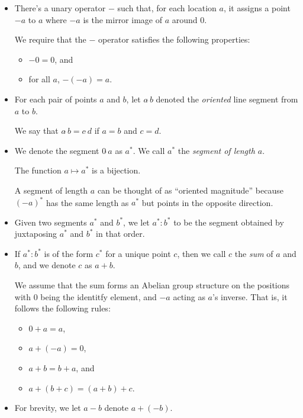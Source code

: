 \documentclass[10pt]{article}
\begin{document}
  \begin{itemize}

  	\item There's a unary operator $-$ such that, for each location $a$, it assigns a point $-a$ to $a$ where $-a$ is the mirror image of $a$ around $0$.

  	We require that the $-$ operator satisfies the following properties:
  	\begin{itemize}
  		\item $-0 = 0$, and
  		\item for all $a$, $-(-a) = a$. 
  	\end{itemize}

  	\item For each pair of points $a$ and $b$, let $a\hat{\ }b$ denoted the \emph{oriented} line segment from $a$ to $b$.

  	We say that $a\hat{\ }b = c\hat{\ }d$ if $a = b$ and $c = d$.

  	\item We denote the segment $0\hat{\ }a$ as $a^*$. We call $a^*$ the \emph{segment of length $a$}.

  	The function $a \mapsto a^*$ is a bijection.

  	A segment of length $a$ can be thought of as ``oriented magnitude'' because $(-a)^*$ has the same length as $a^*$ but points in the opposite direction.

  	\item Given two segments $a^*$ and $b^*$, we let $a^* : b^*$ to be the segment obtained by juxtaposing $a^*$ and $b^*$ in that order.

  	\item If $a^*:b^*$ is of the form $c^*$ for a unique point $c$, then we call $c$ the \emph{sum} of $a$ and $b$, and we denote $c$ as $a + b$.

  	We assume that the sum forms an Abelian group structure on the positions with $0$ being the identitfy element, and $-a$ acting as $a$'s inverse. That is, it follows the following rules:
  	\begin{itemize}
  		\item $0 + a = a$,
  		\item $a + (-a) = 0$,
  		\item $a + b = b + a$, and
  		\item $a + (b + c) = (a + b) + c$.
  	\end{itemize}

  	\item For brevity, we let $a - b$ denote $a + (-b)$.
  \end{itemize}  
\end{document}
